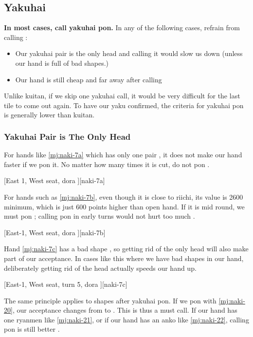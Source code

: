 \documentclass[12pt]{article}
\begin{document}
\subsection{Yakuhai}

\textbf{In most cases, call yakuhai pon.} In any of the following cases, refrain from calling \citep[][p.~103]{hirasawa-naki}:

\begin{itemize}
\item Our yakuhai pair is the only head and calling it would slow us down (unless our hand is full of bad shapes.)
\item Our hand is still cheap and far away after calling
\end{itemize}

Unlike kuitan, if we skip one yakuhai call, it would be very difficult for the last tile to come out again. To have our yaku confirmed, the criteria for yakuhai pon is generally lower than kuitan.


\subsubsection*{Yakuhai Pair is The Only Head}

For hands like \ref{mj:naki-7a} which has only one pair , it does not make our hand faster if we pon it. No matter how many times it is cut, do not pon  \citep[][p.~104]{hirasawa-naki}.

[East 1, West seat, dora ][naki-7a]

For hands such as \ref{mj:naki-7b}, even though it is close to riichi, its value is 2600 minimum, which is just 600 points higher than open hand. If it is mid round, we must pon ; calling pon in early turns would not hurt too much \citep[][pp.~105--106]{hirasawa-naki}.

[East-1, West seat, dora ][naki-7b]

Hand \ref{mj:naki-7c} has a bad shape , so getting rid of the only head will also make  part of our acceptance. In cases like this where we have bad shapes in our hand, deliberately getting rid of the head actually speeds our hand up.

[East-1, West seat, turn 5, dora ][naki-7c]

The same principle applies to shapes after yakuhai pon. If we pon  with \ref{mj:naki-20}, our acceptance changes from  to . This is thus a must call. If our hand has one ryanmen like \ref{mj:naki-21}, or if our hand has an anko like \ref{mj:naki-22}, calling pon is still better \citep[][p.~199]{hirasawa-naki}.
\end{document}
